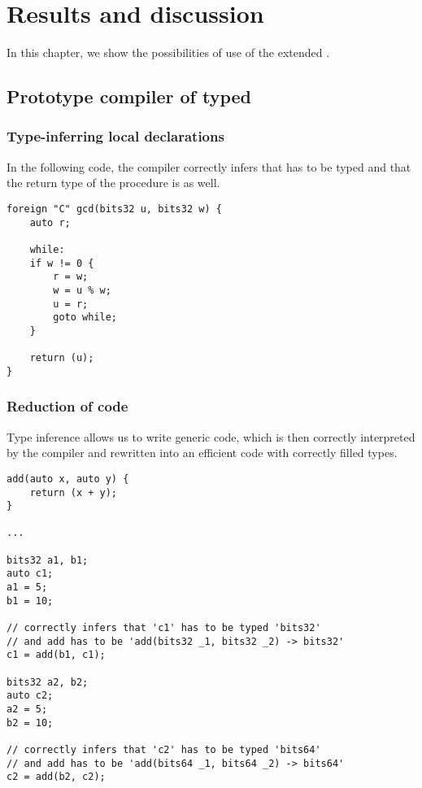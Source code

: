 \chapter{Results and discussion}
\label{chap4}

In this chapter, we show the possibilities of use of the extended \cmm{}.

\section{Prototype compiler of typed \cmm{}}

\subsection{Type-inferring local declarations}

In the following code, the compiler correctly infers that  has to be typed  and that the return type of the procedure  is  as well.

\begin{lstlisting}
foreign "C" gcd(bits32 u, bits32 w) {
    auto r;

    while:
    if w != 0 {
        r = w;
        w = u % w;
        u = r;
        goto while;
    }

    return (u);
}
\end{lstlisting}

\subsection{Reduction of code}

Type inference allows us to write generic code, which is then correctly interpreted by the compiler and rewritten into an efficient code with correctly filled types.

\begin{lstlisting}
add(auto x, auto y) {
    return (x + y);
}

...

bits32 a1, b1;
auto c1;
a1 = 5;
b1 = 10;

// correctly infers that 'c1' has to be typed 'bits32'
// and add has to be 'add(bits32 _1, bits32 _2) -> bits32'
c1 = add(b1, c1);

bits32 a2, b2;
auto c2;
a2 = 5;
b2 = 10;

// correctly infers that 'c2' has to be typed 'bits64'
// and add has to be 'add(bits64 _1, bits64 _2) -> bits64'
c2 = add(b2, c2);
\end{lstlisting}


